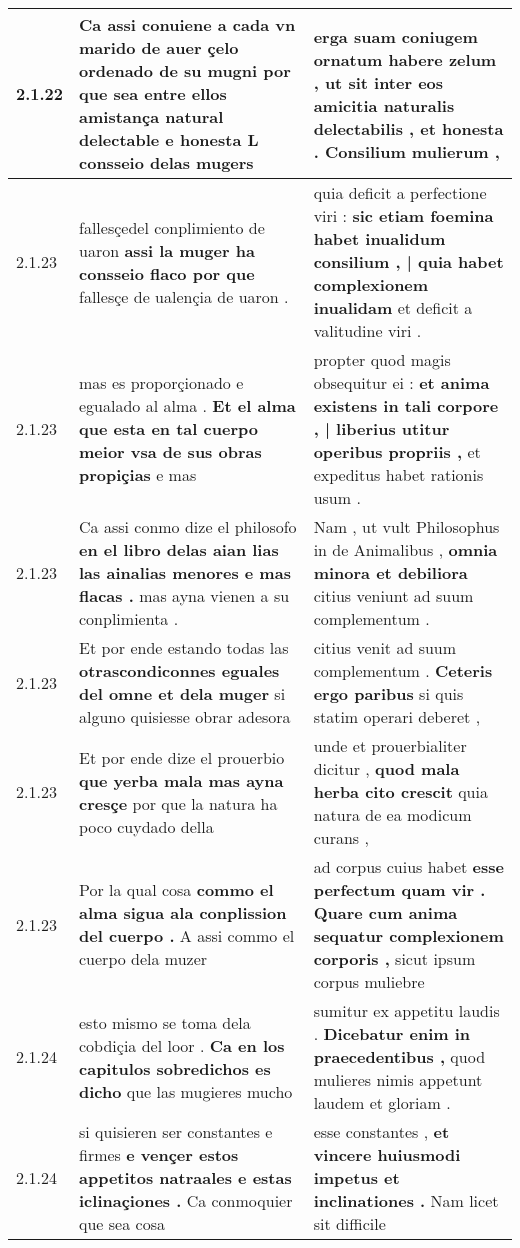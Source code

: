 \begin{tabular}{|p{1cm}|p{6.5cm}|p{6.5cm}|}
2.1.22 & Ca assi conuiene a cada vn marido de auer çelo ordenado de su mugni \textbf{ por que sea entre ellos amistança natural delectable e honesta } L consseio delas mugers & erga suam coniugem ornatum habere zelum , \textbf{ ut sit inter eos amicitia naturalis delectabilis , et honesta . } Consilium mulierum , \\\hline
2.1.23 & fallesçedel conplimiento de uaron \textbf{ assi la muger ha consseio flaco por que } fallesçe de ualençia de uaron . & quia deficit a perfectione viri : \textbf{ sic etiam foemina habet inualidum consilium , | quia habet complexionem inualidam } et deficit a valitudine viri . \\\hline
2.1.23 & mas es proporçionado e egualado al alma . \textbf{ Et el alma que esta en tal cuerpo meior vsa de sus obras propiçias } e mas & propter quod magis obsequitur ei : \textbf{ et anima existens in tali corpore , | liberius utitur operibus propriis , } et expeditus habet rationis usum . \\\hline
2.1.23 & Ca assi conmo dize el philosofo \textbf{ en el libro delas aian lias las ainalias menores e mas flacas . } mas ayna vienen a su conplimienta . & Nam , ut vult Philosophus in de Animalibus , \textbf{ omnia minora et debiliora } citius veniunt ad suum complementum . \\\hline
2.1.23 & Et por ende estando todas las \textbf{ otrascondiconnes eguales del omne et dela muger } si alguno quisiesse obrar adesora & citius venit ad suum complementum . \textbf{ Ceteris ergo paribus } si quis statim operari deberet , \\\hline
2.1.23 & Et por ende dize el prouerbio \textbf{ que yerba mala mas ayna cresçe } por que la natura ha poco cuydado della & unde et prouerbialiter dicitur , \textbf{ quod mala herba cito crescit } quia natura de ea modicum curans , \\\hline
2.1.23 & Por la qual cosa \textbf{ commo el alma sigua ala conplission del cuerpo . } A assi commo el cuerpo dela muzer & ad corpus cuius habet \textbf{ esse perfectum quam vir . Quare cum anima sequatur complexionem corporis , } sicut ipsum corpus muliebre \\\hline
2.1.24 & esto mismo se toma dela cobdiçia del loor . \textbf{ Ca en los capitulos sobredichos es dicho } que las mugieres mucho & sumitur ex appetitu laudis . \textbf{ Dicebatur enim in praecedentibus , } quod mulieres nimis appetunt laudem et gloriam . \\\hline
2.1.24 & si quisieren ser constantes e firmes \textbf{ e vençer estos appetitos natraales e estas iclinaçiones . } Ca conmoquier que sea cosa & esse constantes , \textbf{ et vincere huiusmodi impetus et inclinationes . } Nam licet sit difficile \\\hline

\end{tabular}
